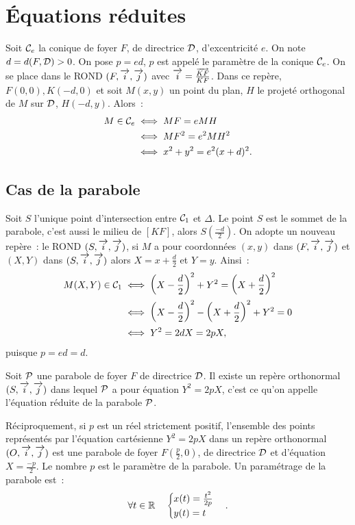 \section{Équations réduites}
\label{sec:eqred}
Soit \(\con{e}\) la conique de foyer \(F\), de directrice \(\Dr\),
d'excentricité \(e\). On note \(d = d(F, \Dr)>0\). On pose \(p = ed\), \(p\) est
appelé le paramètre de la conique \(\con{e}\). On se place dans le ROND
\((F, \vi, \vj)\) avec \(\vi = \frac{\vect{KF}}{KF}\). Dans ce repère, \(F(0, 0),
K(-d, 0)\) et soit \(M(x, y)\) un point du plan, \(H\) le projeté orthogonal de
\(M\) sur \(\Dr\), \(H(-d, y)\). Alors~:
\begin{align}
  M \in \con{e} &\iff MF = e MH \\
                &\iff MF^2 = e^2 MH^2\\
                &\iff x^2 + y^2 = e^2(x + d)^2.
\end{align}

\subsection{Cas de la parabole}
Soit \(S\) l'unique point d'intersection entre \(\con{1}\) et \(\Delta\). Le
point \(S\) est le sommet de la parabole, c'est aussi le milieu de \([KF]\),
alors \(S\left(\frac{-d}{2}\right)\). On adopte un nouveau repère~: le ROND
\((S, \vi, \vj)\), si \(M\) a pour coordonnées \((x, y)\) dans \((F, \vi, \vj)\) et
\((X, Y)\) dans \((S, \vi, \vj)\) alors \(X = x + \frac{d}{2}\) et \(Y = y\). Ainsi~:
\begin{align}
  M(X, Y) \in \con{1} &\iff
  \left(X-\frac{d}{2}\right)^2 + Y^2 = \left(X + \frac{d}{2}\right)^2\\
                      &\iff \left(X-\frac{d}{2}\right)^2 -
                      \left(X + \frac{d}{2}\right)^2 + Y^2 = 0\\
                      &\iff Y^2 = 2dX = 2pX,
\end{align}
puisque \(p = ed = d\).
\begin{theo}
  Soit \(\P\) une parabole de foyer \(F\) de directrice \(\Dr\). Il existe un
  repère orthonormal \((S, \vi, \vj)\) dans lequel \(\P\) a pour équation
  \(Y^2 = 2pX\), c'est ce qu'on appelle l'équation réduite de la parabole \(\P\).

  Réciproquement, si \(p\) est un réel strictement positif, l'ensemble des
  points représentés par l'équation cartésienne \(Y^2 = 2pX\) dans un repère
  orthonormal \(\rond\) est une parabole de foyer
  \(F\left(\frac{p}{2},0\right)\), de directrice \(\Dr\) et d'équation
  \(X = \frac{-p}{2}\). Le nombre \(p\) est le paramètre de la parabole. Un
  paramétrage de la parabole est~:
  \begin{equation}
    \forall t \in \R \quad
    \begin{cases}
      x(t) = \frac{t^2}{2p} \\
      y(t) = t
    \end{cases}.
  \end{equation}
\end{theo}

